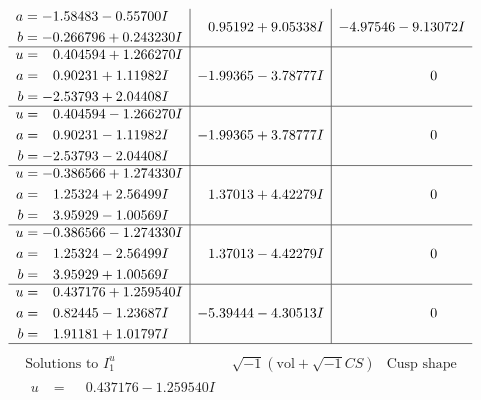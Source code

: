 \documentclass[1p]{elsarticle_modified}
\theoremstyle{definition}
\newcommand{\I}{\sqrt{-1}}
\begin{document}
$$\begin{array}{c|c|c}
\begin{aligned}
a &= -1.58483 - 0.55700 I \\
b &= -0.266796 + 0.243230 I\end{aligned}
 & \phantom{-}0.95192 + 9.05338 I & -4.97546 - 9.13072 I \\ \hline\begin{aligned}
u &= \phantom{-}0.404594 + 1.266270 I \\
a &= \phantom{-}0.90231 + 1.11982 I \\
b &= -2.53793 + 2.04408 I\end{aligned}
 & -1.99365 - 3.78777 I & \phantom{-0.000000 } 0 \\ \hline\begin{aligned}
u &= \phantom{-}0.404594 - 1.266270 I \\
a &= \phantom{-}0.90231 - 1.11982 I \\
b &= -2.53793 - 2.04408 I\end{aligned}
 & -1.99365 + 3.78777 I & \phantom{-0.000000 } 0 \\ \hline\begin{aligned}
u &= -0.386566 + 1.274330 I \\
a &= \phantom{-}1.25324 + 2.56499 I \\
b &= \phantom{-}3.95929 - 1.00569 I\end{aligned}
 & \phantom{-}1.37013 + 4.42279 I & \phantom{-0.000000 } 0 \\ \hline\begin{aligned}
u &= -0.386566 - 1.274330 I \\
a &= \phantom{-}1.25324 - 2.56499 I \\
b &= \phantom{-}3.95929 + 1.00569 I\end{aligned}
 & \phantom{-}1.37013 - 4.42279 I & \phantom{-0.000000 } 0 \\ \hline\begin{aligned}
u &= \phantom{-}0.437176 + 1.259540 I \\
a &= \phantom{-}0.82445 - 1.23687 I \\
b &= \phantom{-}1.91181 + 1.01797 I\end{aligned}
 & -5.39444 - 4.30513 I & \phantom{-0.000000 } 0\\
 \hline 
 \end{array}$$\newpage$$\begin{array}{c|c|c}  
\text{Solutions to }I^u_{1}& \I (\text{vol} + \sqrt{-1}CS) & \text{Cusp shape}\\
 \hline 
\begin{aligned}
u &= \phantom{-}0.437176 - 1.259540 I \\

\end{aligned}
\end{array}$$
\end{document}
